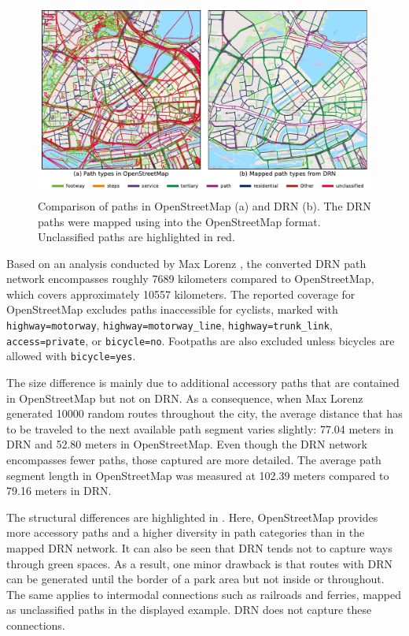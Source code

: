 \begin{figure}[t]
\centering
\includegraphics[width=\linewidth]{images/routing-drn-osm-map.pdf}
\caption{Comparison of paths in OpenStreetMap (a) and DRN (b). The DRN paths were mapped using  into the OpenStreetMap format. Unclassified paths are highlighted in red.}
\label{fig:routing-drn-osm-map}
\end{figure}

Based on an analysis conducted by Max Lorenz \cite{lorenz_2022}, the converted DRN path network encompasses roughly 7689 kilometers compared to OpenStreetMap, which covers approximately 10557 kilometers. The reported coverage for OpenStreetMap excludes paths inaccessible for cyclists, marked with \texttt{highway=motorway}, \texttt{highway=motorway\_line}, \texttt{highway=trunk\_link}, \texttt{access=private}, or \texttt{bi\allowbreak cycle=no}. Footpaths are also excluded unless bicycles are allowed with \texttt{bicycle=yes}. 

The size difference is mainly due to additional accessory paths that are contained in OpenStreetMap but not on DRN. As a consequence, when Max Lorenz \cite{lorenz_2022} generated 10000 random routes throughout the city, the average distance that has to be traveled to the next available path segment varies slightly: 77.04 meters in DRN and 52.80 meters in OpenStreetMap. Even though the DRN network encompasses fewer paths, those captured are more detailed. The average path segment length in OpenStreetMap was measured at 102.39 meters compared to 79.16 meters in DRN.

The structural differences are highlighted in . Here, OpenStreetMap provides more accessory paths and a higher diversity in path categories than in the mapped DRN network. It can also be seen that DRN tends not to capture ways through green spaces. As a result, one minor drawback is that routes with DRN can be generated until the border of a park area but not inside or throughout. The same applies to intermodal connections such as railroads and ferries, mapped as unclassified paths in the displayed example. DRN does not capture these connections.

